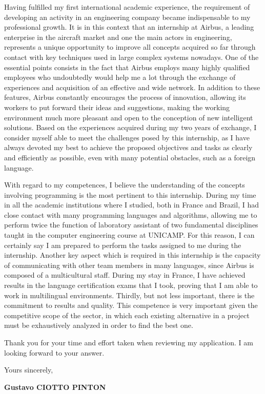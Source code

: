 \documentclass[12pt, a4paper]{article}
\begin{document}
\vspace{12pt}

Having fulfilled my first international academic experience, the requirement of
developing an activity in an engineering company became indispensable to my
professional growth. It is in this context that an internship at Airbus, a
leading enterprise in the aircraft market and one the main actors in
engineering, represents a unique opportunity to improve all concepts acquired
so far through contact with key techniques used in large complex systems
nowadays.  One of the essential points consists in the fact that Airbus employs
many highly qualified employees who undoubtedly would help me a lot through
the exchange of experiences and acquisition of an effective and wide
network. In addition  to these features, Airbus constantly encourages
the process of innovation, allowing its workers to put forward their ideas and
suggestions, making the working environment much more pleasant and open to the
conception of new intelligent solutions. Based on the experiences acquired
during my two years of exchange, I consider myself able to meet the challenges
posed by this internship, as I have always devoted my best to achieve the
proposed objectives and tasks as clearly and efficiently as possible, even with
many potential obstacles, such as a foreign language.


\vspace{12pt}

With regard to my competences,  I believe the understanding of the concepts
involving programming is the most pertinent to this internship. During my time
in all the academic institutions where I studied, both in France and Brazil, I
had close contact with many programming languages and algorithms, allowing me to perform
twice the function of laboratory assistant of two fundamental disciplines taught
in the computer engineering course at UNICAMP. For this reason, I can certainly
say I am prepared to perform the tasks assigned to me during the internship.
Another key aspect which is required in this internship is the capacity of
communicating with other team members in many languages, since Airbus is
composed of a multicultural staff. During my stay in France, I have achieved
results in the language certification exams that I took, proving
that I am able to work in multilingual environments. Thirdly, but not less
important, there is the commitment to results and quality. This competence is very important given
the competitive scope of the sector,  in which each existing alternative  in a
project must be exhaustively analyzed in order to find the best one.


	
\vspace{12pt}

Thank you for your time and effort taken when reviewing my application. I am
looking forward to your answer.

\vspace{12pt}

Yours sincerely,

\begin{flushright}
\textbf{Gustavo CIOTTO PINTON}
\end{flushright}
\end{document}
